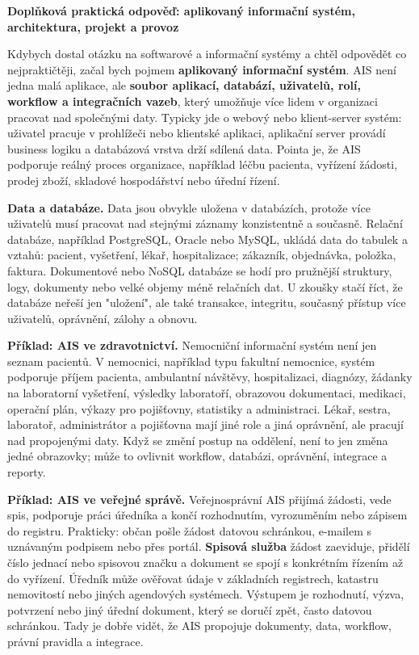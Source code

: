 \begin{greenbox}
\textbf{Doplňková praktická odpověď: aplikovaný informační systém, architektura, projekt a provoz}

Kdybych dostal otázku na softwarové a informační systémy a chtěl odpovědět co nejpraktičtěji, začal bych pojmem \textbf{aplikovaný informační systém}. AIS není jedna malá aplikace, ale \textbf{soubor aplikací, databází, uživatelů, rolí, workflow a integračních vazeb}, který umožňuje více lidem v organizaci pracovat nad společnými daty. Typicky jde o webový nebo klient-server systém: uživatel pracuje v prohlížeči nebo klientské aplikaci, aplikační server provádí business logiku a databázová vrstva drží sdílená data. Pointa je, že AIS podporuje reálný proces organizace, například léčbu pacienta, vyřízení žádosti, prodej zboží, skladové hospodářství nebo úřední řízení.

\textbf{Data a databáze.} Data jsou obvykle uložena v databázích, protože více uživatelů musí pracovat nad stejnými záznamy konzistentně a současně. Relační databáze, například PostgreSQL, Oracle nebo MySQL, ukládá data do tabulek a vztahů: pacient, vyšetření, lékař, hospitalizace; zákazník, objednávka, položka, faktura. Dokumentové nebo NoSQL databáze se hodí pro pružnější struktury, logy, dokumenty nebo velké objemy méně relačních dat. U zkoušky stačí říct, že databáze neřeší jen "uložení", ale také transakce, integritu, současný přístup více uživatelů, oprávnění, zálohy a obnovu.

\textbf{Příklad: AIS ve zdravotnictví.} Nemocniční informační systém není jen seznam pacientů. V nemocnici, například typu fakultní nemocnice, systém podporuje příjem pacienta, ambulantní návštěvy, hospitalizaci, diagnózy, žádanky na laboratorní vyšetření, výsledky laboratoří, obrazovou dokumentaci, medikaci, operační plán, výkazy pro pojišťovny, statistiky a administraci. Lékař, sestra, laboratoř, administrátor a pojišťovna mají jiné role a jiná oprávnění, ale pracují nad propojenými daty. Když se změní postup na oddělení, není to jen změna jedné obrazovky; může to ovlivnit workflow, databázi, oprávnění, integrace a reporty.

\textbf{Příklad: AIS ve veřejné správě.} Veřejnosprávní AIS přijímá žádosti, vede spis, podporuje práci úředníka a končí rozhodnutím, vyrozuměním nebo zápisem do registru. Prakticky: občan pošle žádost datovou schránkou, e-mailem s uznávaným podpisem nebo přes portál. \textbf{Spisová služba} žádost zaeviduje, přidělí číslo jednací nebo spisovou značku a dokument se spojí s konkrétním řízením až do vyřízení. Úředník může ověřovat údaje v základních registrech, katastru nemovitostí nebo jiných agendových systémech. Výstupem je rozhodnutí, výzva, potvrzení nebo jiný úřední dokument, který se doručí zpět, často datovou schránkou. Tady je dobře vidět, že AIS propojuje dokumenty, data, workflow, právní pravidla a integrace.


\end{greenbox}
